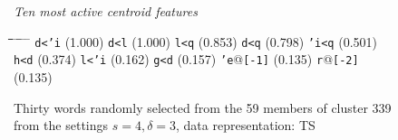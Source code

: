 \begin{figure}[!t]
\begin{mdframed}
\begin{normalsize}
\begin{tabbing}
\end{tabbing}
\end{normalsize}
\vspace{-5pt}
\begin{mdframed}
\begin{small}
\textit{Ten most active centroid features}
\vspace{-3pt}
\begin{tabbing}
\hspace*{6ex}\= \hspace*{11ex}\= \hspace*{6ex}\= \hspace*{11ex}\= \hspace*{7ex} \= \hspace*{11ex} \= \hspace*{8ex}\= \hspace*{11ex} \= \hspace*{8ex} \= \hspace*{9.5ex}\kill
\texttt{d<\a'{i}} \> (1.000) \> \texttt{d<l} \> (1.000) \> \texttt{l<q} \> (0.853) \> \texttt{d<q} \> (0.798) \> \texttt{\a'{i}<q} \> (0.501)\\
\texttt{h<d} \> (0.374) \> \texttt{l<\a'{i}} \> (0.162) \> \texttt{g<d} \> (0.157) \> \texttt{\a'{e}}@\texttt{[-1]} \> (0.135) \> \texttt{r}@\texttt{[-2]} \> (0.135)
\end{tabbing}
\end{small}
\end{mdframed}
\vspace{-5pt}
\caption{Thirty words randomly selected from the 59 members of cluster 339 from the settings $s=4,\delta =3$, data representation: TS}
\label{fig:cluster-339-4-3-TS}
\end{mdframed}
\end{figure}

